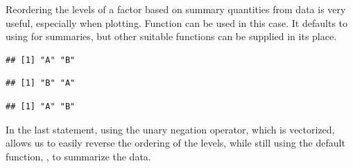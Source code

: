 \documentclass[krantz2]{krantz}\usepackage{knitr}%
\begin{document}
\begin{explainbox}
Reordering the levels of a factor based on summary quantities from data is very useful, especially when plotting. Function  can be used in this case. It defaults to using  for summaries, but other suitable functions can be supplied in its place.

\begin{knitrout}\footnotesize
{}\color{fgcolor}\begin{kframe}
\begin{alltt}
 \hlkwb{<-} \hlstd{(}\hlstd{,} \hlstd{,}  \hlstd{=} \hlstd{(}\hlstd{,} \hlstd{))}
 \hlkwb{<-} \hlstd{(}\hlstd{,} \hlstd{,} \hlstd{,} \hlstd{,} \hlstd{,} \hlstd{,} \hlstd{,} \hlstd{,} \hlstd{,} \hlstd{)}
\end{alltt}
\begin{verbatim}
## [1] "A" "B"
\end{verbatim}
\begin{alltt}
 \hlkwb{<-} 
\end{alltt}
\begin{verbatim}
## [1] "B" "A"
\end{verbatim}
\begin{alltt}
 \hlkwb{<-}  \hlopt{-} 
\end{alltt}
\begin{verbatim}
## [1] "A" "B"
\end{verbatim}
\end{kframe}
\end{knitrout}

In the last statement, using the unary negation operator, which is vectorized, allows us to easily reverse the ordering of the levels, while still using the default function, , to summarize the data.

\end{explainbox}
\end{document}
